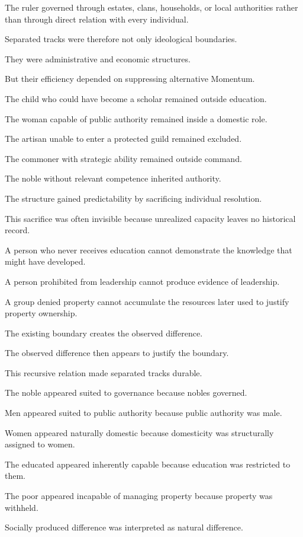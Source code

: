 The ruler governed through estates, clans, households, or local authorities rather than through direct relation with every individual.

Separated tracks were therefore not only ideological boundaries.

They were administrative and economic structures.

But their efficiency depended on suppressing alternative Momentum.

The child who could have become a scholar remained outside education.

The woman capable of public authority remained inside a domestic role.

The artisan unable to enter a protected guild remained excluded.

The commoner with strategic ability remained outside command.

The noble without relevant competence inherited authority.

The structure gained predictability by sacrificing individual resolution.

This sacrifice was often invisible because unrealized capacity leaves no historical record.

A person who never receives education cannot demonstrate the knowledge that might have developed.

A person prohibited from leadership cannot produce evidence of leadership.

A group denied property cannot accumulate the resources later used to justify property ownership.

The existing boundary creates the observed difference.

The observed difference then appears to justify the boundary.

This recursive relation made separated tracks durable.

The noble appeared suited to governance because nobles governed.

Men appeared suited to public authority because public authority was male.

Women appeared naturally domestic because domesticity was structurally assigned to women.

The educated appeared inherently capable because education was restricted to them.

The poor appeared incapable of managing property because property was withheld.

Socially produced difference was interpreted as natural difference.

